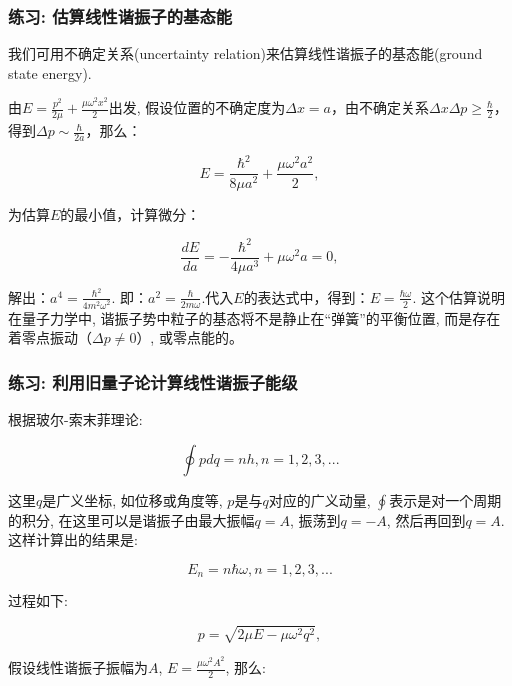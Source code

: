 \subsubsection*{练习: 估算线性谐振子的基态能}

我们可用不确定关系(uncertainty
relation)来估算线性谐振子的基态能(ground state energy).

由$E = \frac{p^2}{2\mu} + \frac{\mu \omega^2 x^2}{2}$出发,
假设位置的不确定度为$\Delta x =a$，由不确定关系$\Delta x \Delta p
\ge \frac{\hbar}{2}$，得到$\Delta p \sim \frac{\hbar}{2a}$，那么：

\begin{equation*}
E = \frac{\hbar^2}{8\mu a^2} + \frac{\mu \omega^2 a^2}{2},
\end{equation*}

为估算$E$的最小值，计算微分：

\begin{equation*}
\frac{d E}{d a} = - \frac{\hbar^2}{4\mu a^3} +\mu \omega^2 a =0,
\end{equation*}


解出：$a^4 = \frac{\hbar^2}{4m^2 \omega^2}$. 即：$a^2 =
\frac{\hbar}{2 m \omega}$.代入$E$的表达式中，得到：$E = \frac{\hbar
\omega}{2}$. 这个估算说明在量子力学中,
谐振子势中粒子的基态将不是静止在“弹簧”的平衡位置,
而是存在着零点振动（$\Delta p \ne 0$）, 或零点能的。

\subsubsection{练习: 利用旧量子论计算线性谐振子能级}

根据玻尔-索末菲理论:

\begin{equation*}
    \oint p dq = nh, n=1,2,3,...
\end{equation*}

这里$q$是广义坐标, 如位移或角度等, $p$是与$q$对应的广义动量,
$\oint$表示是对一个周期的积分, 在这里可以是谐振子由最大振幅$q=A$,
振荡到$q=-A$, 然后再回到$q=A$. 这样计算出的结果是:

\begin{equation*}
E_n = n \hbar \omega, n = 1,2,3,...
\end{equation*}

过程如下:

\begin{equation*}
p=\sqrt{2\mu E- \mu \omega^2 q^2},
\end{equation*}


假设线性谐振子振幅为$A$, $E=\frac{\mu \omega^2 A^2}{2}$, 那么:

